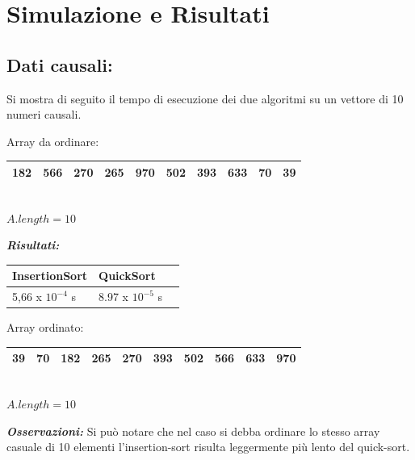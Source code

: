 \documentclass{article}
\begin{document}
\section {Simulazione e Risultati} 

\subsection {Dati causali:} 
Si mostra di seguito il tempo di esecuzione dei due algoritmi su un vettore di 10 numeri causali.

\vspace{0.15in}

\begin{center}
Array da ordinare:
\begin{tabular}[c]{|c|c|c|c|c|c|c|c|c|c|}
\hline
182 & 566 & 270 & 265 & 970 & 502 & 393 & 633 & 70 & 39 \\ 
\hline
\end{tabular}
\\
\vspace{0.10in}
$A.length = 10$
\end{center}

\vspace{0.15in}

\noindent \textit{\bf{Risultati:}}
\newline
\\
\begin{tabular}{|p{}|p{}|p{}|}
\hline
\rule[0,01cm]{0mm}{0,4cm}
\textbf{\large InsertionSort} & \textbf{\large QuickSort} \\
\hline
5,66 x $10^{-4}$ s & 8.97 x $10^{-5}$ s \\
\hline
\end{tabular}

\begin{center}
Array ordinato:
\begin{tabular}[c]{|c|c|c|c|c|c|c|c|c|c|}
\hline
39 & 70 & 182 & 265 & 270 & 393 & 502 & 566 & 633 & 970 \\ 
\hline
\end{tabular}
\\
\vspace{0.10in}
$A.length = 10$
\end{center}

\vspace{0.15in}

\noindent \textit{\bf{Osservazioni:}}
\newline
Si può notare che nel caso si debba ordinare lo stesso array casuale di 10 elementi l'insertion-sort risulta leggermente più lento del quick-sort. \\
\end{document}
